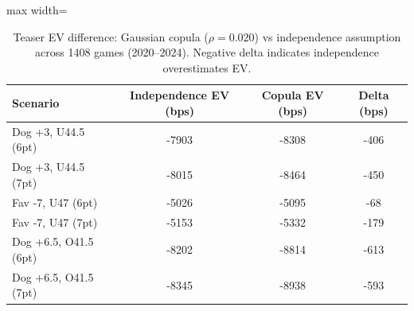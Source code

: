 \begin{table}[t]
    \centering
    \caption[Copula vs independence teaser pricing]{Teaser EV difference: Gaussian copula ($\rho=0.020$) vs independence assumption across 1408 games (2020--2024). Negative delta indicates independence overestimates EV.}
    \label{tab:teaser-copula-impact}
    \begin{adjustbox}{max width=\textwidth}
    \begin{tabular}{lccc}
      \toprule
      \textbf{Scenario} & \textbf{Independence EV (bps)} & \textbf{Copula EV (bps)} & \textbf{Delta (bps)} \\
      \midrule
      Dog +3, U44.5 (6pt) & -7903 & -8308 & -406 \\
      Dog +3, U44.5 (7pt) & -8015 & -8464 & -450 \\
      Fav -7, U47 (6pt) & -5026 & -5095 & -68 \\
      Fav -7, U47 (7pt) & -5153 & -5332 & -179 \\
      Dog +6.5, O41.5 (6pt) & -8202 & -8814 & -613 \\
      Dog +6.5, O41.5 (7pt) & -8345 & -8938 & -593 \\
      \bottomrule
    \end{tabular}
    \end{adjustbox}
  \end{table}

